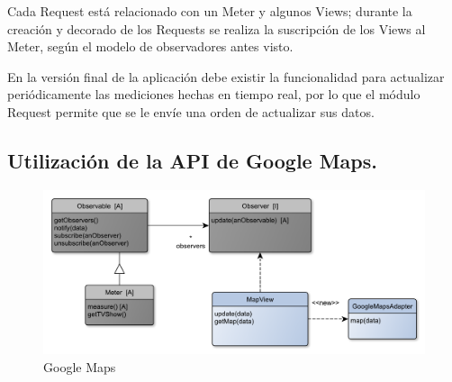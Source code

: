 Cada Request está relacionado con un  Meter y algunos Views; durante la creación y decorado de los Requests se realiza la suscripción de los Views al Meter, según el modelo de observadores antes visto.
\bigskip

En la versión final de la aplicación debe existir la funcionalidad para actualizar periódicamente las mediciones hechas en tiempo real, por lo que el módulo Request permite que se le envíe una orden de actualizar sus datos.



\subsection{Utilización de la API de Google Maps.}

\begin{figure}[H]
\centering
\includegraphics[width=\textwidth]{graph/clase/map.pdf}
\caption{Google Maps}
\end{figure}

